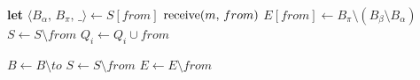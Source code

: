 {  \begin{multicols}{2}
    \EmptyComment*{}
    \EmptyComment*{}
    \columnbreak
   {
    \textbf{let} $\langle B_\alpha,\, B_\pi,\, \_ \rangle \leftarrow S[from]$ \;
    {$\textup{receive}(m,\,from)$ \label{line:todeliver}}  %
    $E[from] \leftarrow B_\pi \setminus (B_\beta\setminus B_\alpha)$ \label{line:toexpect} \;%
    $S \leftarrow S \setminus from$ \;
    $Q_i \leftarrow Q_i \cup from$ \; %
  }
  \end{multicols}
  \BlankLine
  
  \begin{multicols}{2}
   {
    $B \leftarrow B \setminus to$
  }
   {
    $S \leftarrow S \setminus from$ \;
    $E \leftarrow E \setminus from$
  }
  \end{multicols}
  \BlankLine
}


